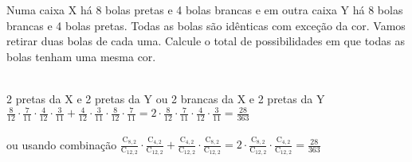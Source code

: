 \begin{ex}
 	Numa caixa X há 8 bolas pretas e 4 bolas brancas e em outra caixa Y há 8 bolas brancas e 4 bolas pretas. Todas as bolas são idênticas com exceção da cor. Vamos retirar duas bolas de cada uma. Calcule o total de possibilidades em que todas as bolas tenham uma mesma cor.
 	  \begin{sol}
 	  \phantom{A}  \\
 	  2 pretas da X e 2 pretas da Y ou 2 brancas da X e 2 pretas da Y \\
 	  $\frac{8}{12}\cdot\frac{7}{11}\cdot\frac{4}{12}\cdot\frac{3}{11}+\frac{4}{12}\cdot\frac{3}{11}\cdot\frac{8}{12}\cdot\frac{7}{11}=2\cdot\frac{8}{12}\cdot\frac{7}{11}\cdot\frac{4}{12}\cdot\frac{3}{11}=\frac{28}{363}$ \\ \\
 	  ou usando combinação $\frac{\mathrm{C}_{8,2}}{\mathrm{C}_{{12},2}}\cdot\frac{\mathrm{C}_{4,2}}{\mathrm{C}_{{12},2}}+\frac{\mathrm{C}_{4,2}}{\mathrm{C}_{{12},2}}\cdot\frac{\mathrm{C}_{8,2}}{\mathrm{C}_{{12},2}}=2\cdot\frac{\mathrm{C}_{8,2}}{\mathrm{C}_{{12},2}}\cdot\frac{\mathrm{C}_{4,2}}{\mathrm{C}_{{12},2}}=\frac{28}{363}$ 
 	  
 	  \end{sol}
\end{ex}